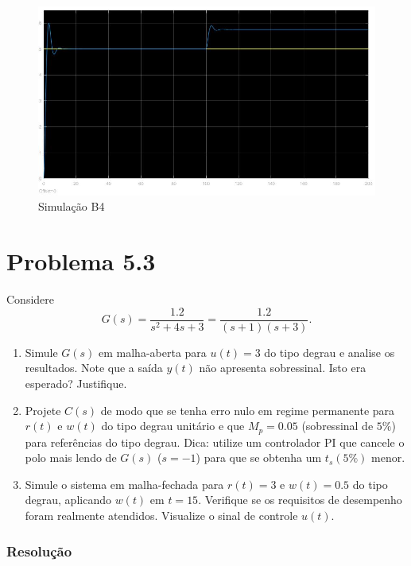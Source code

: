 \documentclass[
]{book}
\providecommand{\tightlist}{%
  \setlength{\itemsep}{0pt}\setlength{\parskip}{0pt}}
\theoremstyle{definition}
\theoremstyle{definition}
\theoremstyle{definition}
\theoremstyle{remark}
\begin{document}
\begin{figure}

{\centering \includegraphics[width=0.8\linewidth]{Imagens/Lab5/Resolução/prob2D1} 

}

\caption{Simulação B4}\label{fig:prob2D1}
\end{figure}

\hypertarget{problema-5.3}{%
\section*{Problema 5.3}\label{problema-5.3}}

Considere
\[
G(s) = \frac{1.2}{s^2+4s+3} = \frac{1.2}{(s+1)(s+3)}.
\]

\begin{enumerate}
\def\labelenumi{(\alph{enumi})}
\tightlist
\item
  Simule \(G(s)\) em malha-aberta para \(u(t) =3\) do tipo degrau e analise os resultados. Note que a saída \(y(t)\) não apresenta sobressinal. Isto era esperado? Justifique.
\item
  Projete \(C(s)\) de modo que se tenha erro nulo em regime permanente para \(r(t)\) e \(w(t)\) do tipo degrau unitário e que \(M_p=0.05\) (sobressinal de \(5\%\)) para referências do tipo degrau. Dica: utilize um controlador PI que cancele o polo mais lendo de \(G(s)\) (\(s=-1\)) para que se obtenha um \(t_s(5\%)\) menor.
\item
  Simule o sistema em malha-fechada para \(r(t) = 3\) e \(w(t) = 0.5\) do tipo degrau, aplicando \(w(t)\) em \(t=15\). Verifique se os requisitos de desempenho foram realmente atendidos. Visualize o sinal de controle \(u(t)\).
\end{enumerate}

\hypertarget{resoluuxe7uxe3o-2}{%
\subsubsection*{Resolução}\label{resoluuxe7uxe3o-2}}
\end{document}
